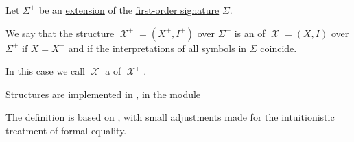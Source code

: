 \begin{definition}\label{def:fol_structure_expansion}
  Let \( \Sigma^+ \) be an \hyperref[def:fol_signature_extension]{extension} of the \hyperref[def:fol_signature]{first-order signature} \( \Sigma \).

  We say that the \hyperref[def:fol_structure]{structure} \( \mscrX^+ = (X^+, I^+) \) over \( \Sigma^+ \) is an  of \( \mscrX = (X, I) \) over \( \Sigma^+ \) if \( X = X^+ \) and if the interpretations of all symbols in \( \Sigma \) coincide.

  In this case we call \( \mscrX \) a  of \( \mscrX^+ \).
\end{definition}
\begin{comments}
  \item Structures are implemented in \cite{notebook:code}, in the module
  \begin{CodeRefDisplay}
  \end{CodeRefDisplay}

  \item The definition is based on \cite[def. 2.6.3]{Hinman2005Logic}, with small adjustments made for the intuitionistic treatment of formal equality.
\end{comments}

